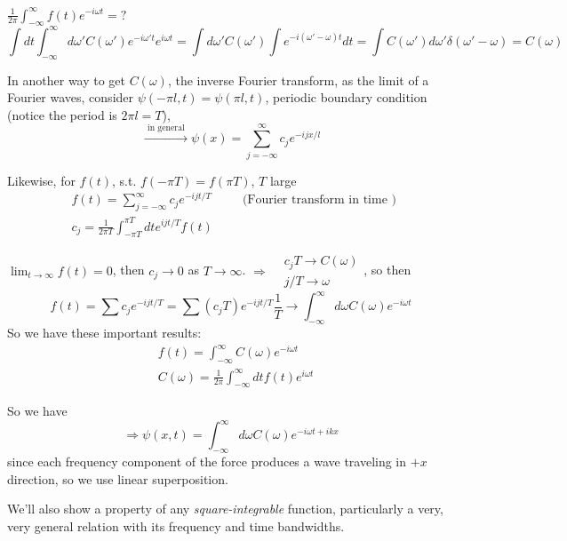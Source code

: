 \documentclass[twoside, 10pt]{amsart}
\begin{document}
$\frac{1}{2\pi} \int_{-\infty}^{\infty} f(t) e^{- i \omega t} = ?$
\[
\int dt \int_{-\infty}^{\infty} d\omega' C(\omega') e^{- i \omega' t} e^{i\omega t} = \int d\omega' C(\omega') \int e^{- i( \omega' - \omega)t } dt = \int C(\omega') d\omega' \delta(\omega' - \omega) = C(\omega)
\]

In another way to get $C(\omega)$, the inverse Fourier transform, as the limit of a Fourier waves, consider $\psi(-\pi l,t) = \psi(\pi l,t) $, periodic boundary condition (notice the period is $2\pi l = T$), 
\[
\xrightarrow{ \text{ in general } } \psi(x) = \sum_{j=-\infty}^{\infty} c_j e^{-ijx/l}
\]

Likewise, for $f(t)$, s.t. $f(-\pi T) = f(\pi T)$, $T$ large
\[
\begin{aligned}
  & f(t) = \sum_{j=-\infty}^{\infty} c_j e^{-ijt/T} \quad \quad \, \text{ (Fourier transform in time ) } \\
  & c_j = \frac{1}{2\pi T} \int_{-\pi T}^{\pi T} dt e^{ijt/T} f(t) 
\end{aligned}
\]

$\lim_{t\to \infty} f(t) = 0$, then $c_j \to 0$ as $T \to \infty$.  $\Longrightarrow \begin{aligned}
  & c_j T \to C(\omega) \\
  & j/T \to \omega 
\end{aligned}$, so then
\[
f(t) = \sum c_j e^{-ij t/T} = \sum (c_j T) e^{-ijt/T} \frac{1}{T} \to \int_{-\infty}^{\infty} d\omega C(\omega) e^{-i \omega t} 
\]
So we have these important results:
\begin{align}
 & \boxed{ f(t)  = \int_{-\infty}^{\infty} C(\omega) e^{- i\omega t}  }\\
 & \boxed{ C(\omega)  = \frac{1}{2\pi} \int_{-\infty}^{\infty} dt f(t) e^{ i \omega t}  }
\end{align}

So we have
\[
\Longrightarrow \psi(x,t) = \int_{-\infty}^{\infty} d\omega C(\omega) e^{-i\omega t + ikx}
\]
since each frequency component of the force produces a wave traveling in $+x$ direction, so we use linear superposition.  

We'll also show a property of any \emph{square-integrable} function, particularly a very, very general relation with its frequency and time bandwidths.  
\end{document}
